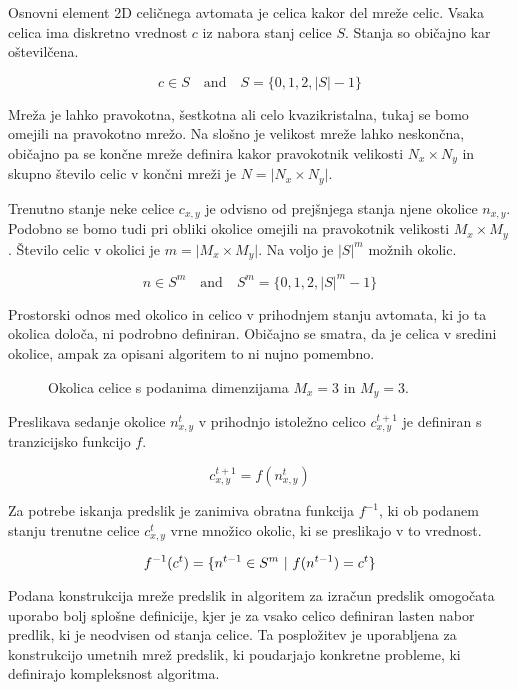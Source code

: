 \documentclass[12pt,a4paper,openany]{book}
\begin{document}
Osnovni element 2D celičnega avtomata je celica kakor del mreže celic.
Vsaka celica ima diskretno vrednost \(c\) iz nabora stanj celice \(S\).
Stanja so običajno kar oštevilčena.

\[ c \in S
   \quad \textrm{and} \quad
   S = \{ 0, 1, 2, {\lvert S \rvert} -1 \} \]

Mreža je lahko pravokotna, šestkotna ali celo kvazikristalna, tukaj se
bomo omejili na pravokotno mrežo. Na slošno je velikost mreže lahko neskončna,
običajno pa se končne mreže definira kakor pravokotnik velikosti \(N_x \times N_y\)
in skupno število celic v končni mreži je \(N=\lvert N_x \times N_y \rvert\).

Trenutno stanje neke celice \(c_{x,y}\) je odvisno od prejšnjega stanja njene okolice \(n_{x,y}\).
Podobno se bomo tudi pri obliki okolice omejili na pravokotnik velikosti \(M_x \times M_y\).
Število celic v okolici je \(m=\lvert M_x \times M_y \rvert\).
Na voljo je \({\lvert S \rvert}^m\) možnih okolic.

\[ n \in S^m
   \quad \textrm{and} \quad
   S^m = \{ 0, 1, 2, {\lvert S \rvert}^m -1 \} \]

Prostorski odnos med okolico in celico v prihodnjem stanju avtomata, ki jo ta okolica določa,
ni podrobno definiran. Običajno se smatra, da je celica v sredini okolice, ampak za opisani algoritem to ni
nujno pomembno.

\begin{figure}[htb]
\centerline{}
\caption[Okolica.]{Okolica celice s podanima dimenzijama \(M_x=3\) in \(M_y=3\).}
\label{neighborhood}
\end{figure}

Preslikava sedanje okolice \(n_{x,y}^{t}\) v prihodnjo istoležno celico \(c_{x,y}^{t+1}\) je definiran
s tranzicijsko funkcijo \(f\).

\[ c_{x,y}^{t+1} = f(n_{x,y}^{t}) \]

Za potrebe iskanja predslik je zanimiva obratna funkcija \(f^{-1}\), ki ob
podanem stanju trenutne celice \(c_{x,y}^{t}\) vrne množico okolic,
ki se preslikajo v to vrednost.

\[ f^{-1}(c^{t}) = \{ n^{t-1} \in S^m \ \arrowvert \ f(n^{t-1}) = c^{t} \} \]

Podana konstrukcija mreže predslik in algoritem za izračun predslik omogočata uporabo
bolj splošne definicije, kjer je za vsako celico definiran lasten nabor predlik,
ki je neodvisen od stanja celice. Ta pospložitev je uporabljena za konstrukcijo umetnih
mrež predslik, ki poudarjajo konkretne probleme, ki definirajo kompleksnost algoritma.
\end{document}
